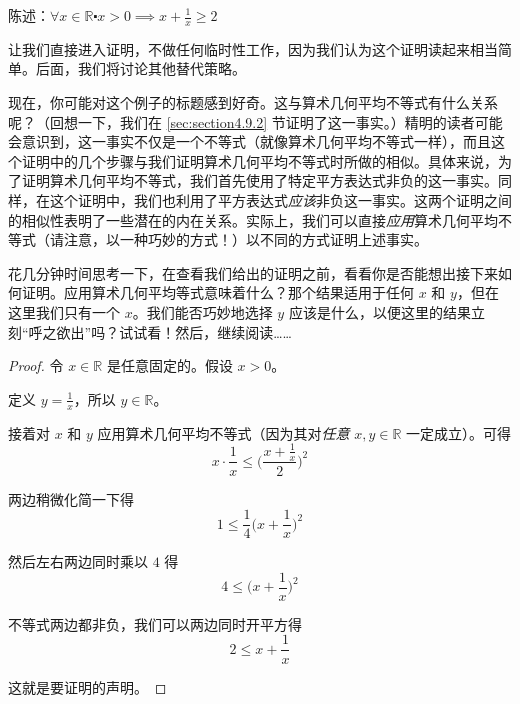 \begin{example}[令人惊讶的算术几何平均不等式]

    陈述：$\forall x \in \mathbb{R} \centerdot x > 0 \implies x + \frac{1}{x} \ge 2$
\end{example}

让我们直接进入证明，不做任何临时性工作，因为我们认为这个证明读起来相当简单。后面，我们将讨论其他替代策略。

\begin{center}
    \noindent {}
\end{center}

现在，你可能对这个例子的标题感到好奇。这与算术几何平均不等式有什么关系呢？（回想一下，我们在 \ref{sec:section4.9.2} 节证明了这一事实。）精明的读者可能会意识到，这一事实不仅是一个不等式（就像算术几何平均不等式一样），而且这个证明中的几个步骤与我们证明算术几何平均不等式时所做的相似。具体来说，为了证明算术几何平均不等式，我们首先使用了特定平方表达式非负的这一事实。同样，在这个证明中，我们也利用了平方表达式\emph{应该}非负这一事实。这两个证明之间的相似性表明了一些潜在的内在关系。实际上，我们可以直接\emph{应用}算术几何平均不等式（请注意，以一种巧妙的方式！）以不同的方式证明上述事实。

花几分钟时间思考一下，在查看我们给出的证明之前，看看你是否能想出接下来如何证明。应用算术几何平均等式意味着什么？那个结果适用于任何 $x$ 和 $y$，但在这里我们只有一个 $x$。我们能否巧妙地选择 $y$ 应该是什么，以便这里的结果立刻``呼之欲出''吗？试试看！然后，继续阅读……

\begin{proof}
    令 $x \in \mathbb{R}$ 是任意固定的。假设 $x>0$。

    定义 $y = \frac{1}{x}$，所以 $y \in \mathbb{R}$。

    接着对 $x$ 和 $y$ 应用算术几何平均不等式（因为其对\emph{任意} $x,y \in \mathbb{R}$ 一定成立）。可得
    \[x \cdot \frac{1}{x} \le \Big(\frac{x+\frac{1}{x}}{2}\Big)^2\]

    两边稍微化简一下得
    \[1 \le \frac{1}{4}\Big(x+\frac{1}{x}\Big)^2\]

    然后左右两边同时乘以 $4$ 得
    \[4 \le \Big(x+\frac{1}{x}\Big)^2\]

    不等式两边都非负，我们可以两边同时开平方得
    \[2 \le x+\frac{1}{x}\]

    这就是要证明的声明。
\end{proof}

